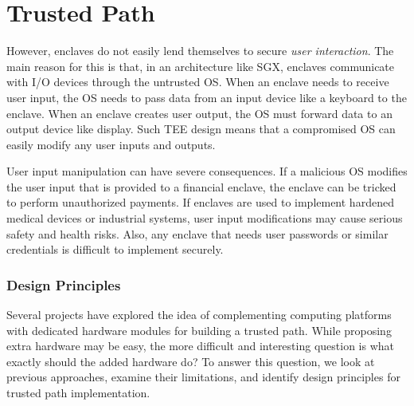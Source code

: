 
\section*{Trusted Path}

 However, enclaves do not easily lend themselves to secure \emph{user interaction}. The main reason for this is that, in an architecture like SGX, enclaves communicate with I/O devices through the untrusted OS. When an enclave needs to receive user input, the OS needs to pass data from an input device like a keyboard to the enclave. When an enclave creates user output, the OS must forward data to an output device like display. Such TEE design means that a compromised OS can easily modify any user inputs and outputs.

User input manipulation can have severe consequences. If a malicious OS modifies the user input that is provided to a financial enclave, the enclave can be tricked to perform unauthorized payments. If enclaves are used to implement hardened medical devices or industrial systems, user input modifications may cause serious safety and health risks. Also, any enclave that needs user passwords or similar credentials is difficult to implement securely.




\subsubsection*{Design Principles}

Several projects have explored the idea of complementing computing platforms with dedicated hardware modules for building a trusted path. While proposing extra hardware may be easy, the more difficult and interesting question is what exactly should the added hardware do? To answer this question, we look at previous approaches, examine their limitations, and identify design principles for trusted path implementation.
    
